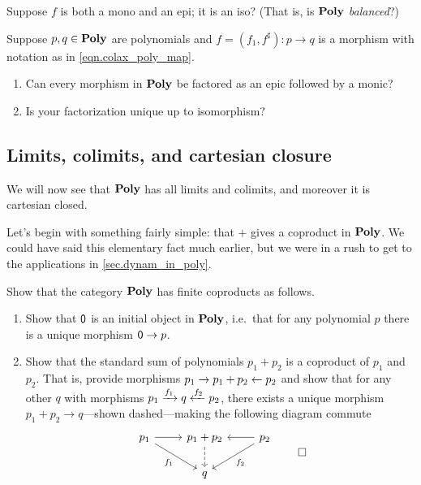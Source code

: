 \documentclass[Book-Poly]{subfiles}
\begin{document}
\begin{exercise}
Suppose $f$ is both a mono and an epi; it is an iso? (That is, is $\mathbf{Poly}$ \emph{balanced}?)
\end{exercise}

\begin{exercise}\label{exc.mono_epi_poly}
Suppose $p,q\in\mathbf{Poly}$ are polynomials and $f=(f_1,f^\sharp)\colon p\to q$ is a morphism with notation as in \eqref{eqn.colax_poly_map}.
\begin{enumerate}
	\item Can every morphism in $\mathbf{Poly}$ be factored as an epic followed by a monic?
	\item Is your factorization unique up to isomorphism?
\qedhere
\end{enumerate}
\end{exercise}



\subsection{Limits, colimits, and cartesian closure}

We will now see that $\mathbf{Poly}$ has all limits and colimits, and moreover it is cartesian closed.

Let's begin with something fairly simple: that $+$ gives a coproduct in $\mathbf{Poly}$. We could have said this elementary fact much earlier, but we were in a rush to get to the applications in \cref{sec.dynam_in_poly}.

\begin{exercise}
Show that the category $\mathbf{Poly}$ has finite coproducts as follows.
\begin{enumerate}
	\item Show that $\textsf{0}$ is an initial object in $\mathbf{Poly}$, i.e.\ that for any polynomial $p$ there is a unique morphism $\textsf{0}\to p$.
	\item Show that the standard sum of polynomials $p_1+p_2$ is a coproduct of $p_1$ and $p_2$. That is, provide morphisms $p_1\to p_1+p_2\leftarrow p_2$ and show that for any other $q$ with morphisms $p_1\xrightarrow{f_1} q\xleftarrow{f_2} p_2$, there exists a unique morphism $p_1+p_2\to q$---shown dashed---making the following diagram commute 
	\[
	\begin{tikzcd}
		p_1\ar[r]\ar[dr, "f_1"']&
		p_1+p_2\ar[d, dashed]&
		p_2\ar[l]\ar[dl, "f_2"]\\&
		q
	\end{tikzcd}
	\qedhere
	\]
\end{enumerate}
\end{exercise}
\end{document}
